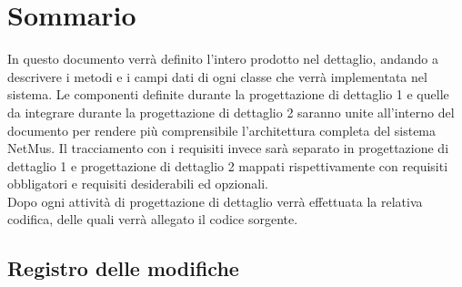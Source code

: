 \newcommand{\nomedoc}{Definizione Del Prodotto}
\newcommand{\versione}{1.0}
\newcommand{\versioneglossario}{3.0}
\newcommand{\versionenormeprogetto}{3.0}
\newcommand{\versionespecifica}{2.0}
\newcommand{\nomefile}{DefinizioneDelProdotto-\versione.pdf}
\newcommand{\datacreazione}{3 Febbraio 2011}
\newcommand{\datamodifica}{23 Febbraio 2011}
\newcommand{\stato}{formale}
\newcommand{\uso}{esterno}
\newcommand{\redazione}{---}
\newcommand{\verifica}{---}
\newcommand{\approvazione}{---}
\newcommand{\distribuzione}{
VT.G \\
& Prof. Vardanega Tullio\\
& Prof. Cardin Riccardo }


\usepackage{amsfonts}





\chapter*{Sommario}
\thispagestyle{fancy}
In questo documento verr\`a definito l'intero prodotto nel dettaglio, andando a
descrivere i metodi e i campi dati di ogni classe che verr\`a implementata nel
sistema. Le componenti definite durante la progettazione di dettaglio 1 e quelle
da integrare durante la progettazione di dettaglio 2 saranno unite all'interno
del documento per rendere pi\`u comprensibile l'architettura completa del sistema
NetMus. Il tracciamento con i requisiti invece sar\`a separato in progettazione
di dettaglio 1 e progettazione di dettaglio 2 mappati rispettivamente con
requisiti obbligatori e requisiti desiderabili ed opzionali.\\
Dopo ogni attivit\`a di progettazione di dettaglio verr\`a effettuata la
relativa codifica, delle quali verr\`a allegato il codice sorgente.

\newpage
\section*{Registro delle modifiche}

